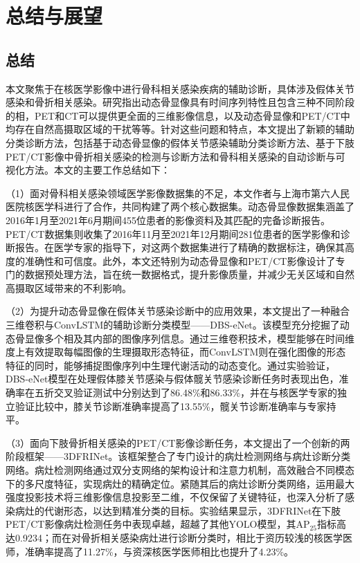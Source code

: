 \chapter{总结与展望}

\section{总结}

本文聚焦于在核医学影像中进行骨科相关感染疾病的辅助诊断，具体涉及假体关节感染和骨折相关感染。研究指出动态骨显像具有时间序列特性且包含三种不同阶段的相，PET和CT可以提供更全面的三维影像信息，以及动态骨显像和PET/CT中均存在自然高摄取区域的干扰等等。针对这些问题和特点，本文提出了新颖的辅助分类诊断方法，包括基于动态骨显像的假体关节感染辅助分类诊断方法、基于下肢PET/CT影像中骨折相关感染的检测与诊断方法和骨科相关感染的自动诊断与可视化方法。本文的主要工作总结如下：

（1）面对骨科相关感染领域医学影像数据集的不足，本文作者与上海市第六人民医院核医学科进行了合作，共同构建了两个核心数据集。动态骨显像数据集涵盖了2016年1月至2021年6月期间455位患者的影像资料及其匹配的完备诊断报告。PET/CT数据集则收集了2016年11月至2021年12月期间281位患者的医学影像和诊断报告。在医学专家的指导下，对这两个数据集进行了精确的数据标注，确保其高度的准确性和可信度。此外，本文还特别为动态骨显像和PET/CT影像设计了专门的数据预处理方法，旨在统一数据格式，提升影像质量，并减少无关区域和自然高摄取区域带来的不利影响。

（2）为提升动态骨显像在假体关节感染诊断中的应用效果，本文提出了一种融合三维卷积与ConvLSTM的辅助诊断分类模型——DBS-eNet。该模型充分挖掘了动态骨显像多个相及其内部的图像序列信息。通过三维卷积技术，模型能够在时间维度上有效提取每幅图像的生理摄取形态特征，而ConvLSTM则在强化图像的形态特征的同时，能够捕捉图像序列中生理代谢活动的动态变化。通过实验验证，DBS-eNet模型在处理假体膝关节感染与假体髋关节感染诊断任务时表现出色，准确率在五折交叉验证测试中分别达到了86.48\%和86.33\%，并在与核医学专家的独立验证比较中，膝关节诊断准确率提高了13.55\%，髋关节诊断准确率与专家持平。

（3）面向下肢骨折相关感染的PET/CT影像诊断任务，本文提出了一个创新的两阶段框架——3DFRINet。该框架整合了专门设计的病灶检测网络与病灶诊断分类网络。病灶检测网络通过双分支网络的架构设计和注意力机制，高效融合不同模态下的多尺度特征，实现病灶的精确定位。紧随其后的病灶诊断分类网络，运用最大强度投影技术将三维影像信息投影至二维，不仅保留了关键特征，也深入分析了感染病灶的代谢形态，以达到精准分类的目标。实验结果显示，3DFRINet在下肢PET/CT影像病灶检测任务中表现卓越，超越了其他YOLO模型，其AP\(_{25}\)指标高达0.9234；而在对骨折相关感染病灶进行诊断分类时，相比于资历较浅的核医学医师，准确率提高了11.27\%，与资深核医学医师相比也提升了4.23\%。

